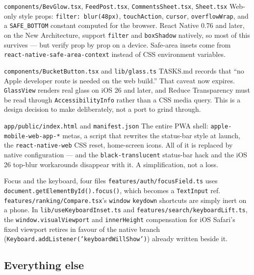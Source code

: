 \documentclass[11pt]{article}
\newcommand{\code}[1]{\texttt{\small #1}}
\newcommand{\bk}{\discretionary{}{}{}}
\newenvironment{findings}
  {\begin{description}[style=nextline,leftmargin=1.1em,labelindent=0pt,
     itemsep=1.05em,parsep=0.3em,topsep=0.6em,font=\normalfont\color{ink}\bfseries]}
  {\end{description}}
\begin{document}
\begin{findings}

\item[\code{components/BevGlow.tsx}, \code{FeedPost.tsx}, \code{CommentsSheet.tsx},
\code{Sheet.tsx}]
Web-only style props: \code{filter: blur(48px)}, \code{touchAction}, \code{cursor},
\code{overflowWrap}, and a \code{SAFE\_BOTTOM} constant computed for the browser. React Native 0.76
and later, on the New Architecture, support \code{filter} and \code{boxShadow} natively, so most of
this survives --- but verify prop by prop on a device. Safe-area insets come from
\code{react-native-\bk safe-area-context} instead of CSS environment variables.

\item[\code{components/BucketButton.tsx} and \code{lib/glass.ts}]
TASKS.md records that ``no Apple developer route is needed on the web build.'' That caveat now
expires. \code{GlassView} renders real glass on iOS 26 and later, and Reduce Transparency must be
read through \code{AccessibilityInfo} rather than a CSS media query. This is a design decision to
make deliberately, not a port to grind through.

\item[\code{app/public/index.html} and \code{manifest.json}]
The entire PWA shell: \code{apple-mobile-web-app-*} metas, a script that rewrites the status-bar
style at launch, the \code{react-native-web} CSS reset, home-screen icons. All of it is replaced by
native configuration --- and the \code{black-translucent} status-bar hack and the iOS 26 top-blur
workarounds disappear with it. A simplification, not a loss.

\item[Focus and the keyboard, four files]
\code{features/auth/\bk focusField.ts} uses \code{document.getElementById().focus()}, which becomes a
\code{TextInput} ref. \code{features/ranking/\bk Compare.tsx}'s \code{window} \code{keydown}
shortcuts are simply inert on a phone. In \code{lib/useKeyboard\bk Inset.ts} and
\code{features/search/\bk keyboardLift.ts}, the \code{window.visualViewport} and
\code{innerHeight} compensation for iOS Safari's fixed viewport retires in favour of the native
branch (\code{Keyboard.\bk addListener('keyboardWillShow')}) already written beside it.

\end{findings}

\subsection{Everything else}
\end{document}
